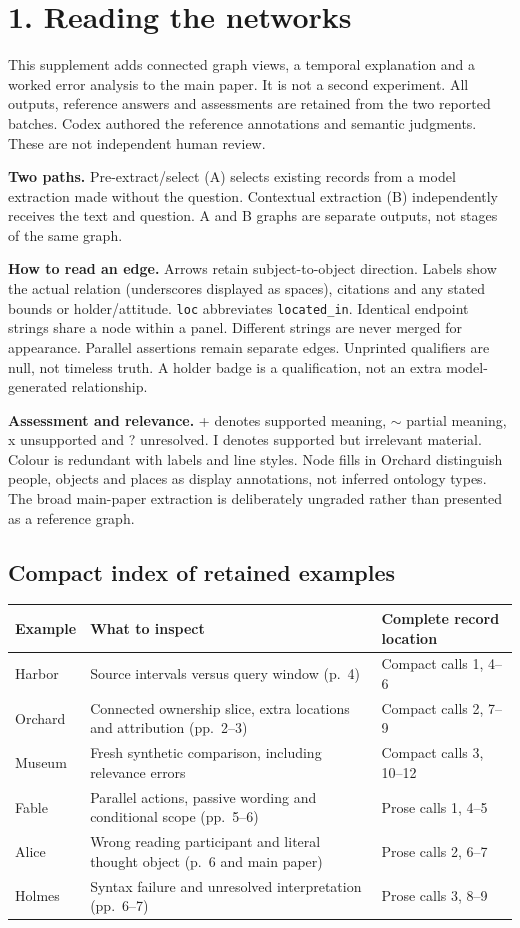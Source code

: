 \section*{1. Reading the networks}
This supplement adds connected graph views, a temporal explanation and a worked error analysis to the main paper. It is not a second experiment. All outputs, reference answers and assessments are retained from the two reported batches. Codex authored the reference annotations and semantic judgments. These are not independent human review.

\textbf{Two paths.} Pre-extract/select (A) selects existing records from a model extraction made without the question. Contextual extraction (B) independently receives the text and question. A and B graphs are separate outputs, not stages of the same graph.

\textbf{How to read an edge.} Arrows retain subject-to-object direction. Labels show the actual relation (underscores displayed as spaces), citations and any stated bounds or holder/attitude. \texttt{loc} abbreviates \texttt{located\_in}. Identical endpoint strings share a node within a panel. Different strings are never merged for appearance. Parallel assertions remain separate edges. Unprinted qualifiers are null, not timeless truth. A holder badge is a qualification, not an extra model-generated relationship.

\textbf{Assessment and relevance.} + denotes supported meaning, $\sim$ partial meaning, x unsupported and ? unresolved. I denotes supported but irrelevant material. Colour is redundant with labels and line styles. Node fills in Orchard distinguish people, objects and places as display annotations, not inferred ontology types. The broad main-paper extraction is deliberately ungraded rather than presented as a reference graph.

\subsection*{Compact index of retained examples}
\begin{tabular}{L{27mm}L{58mm}L{60mm}}
\toprule
Example & What to inspect & Complete record location\\\midrule
Harbor & Source intervals versus query window (p.~4) & Compact calls 1, 4--6\\
Orchard & Connected ownership slice, extra locations and attribution (pp.~2--3) & Compact calls 2, 7--9\\
Museum & Fresh synthetic comparison, including relevance errors & Compact calls 3, 10--12\\
Fable & Parallel actions, passive wording and conditional scope (pp.~5--6) & Prose calls 1, 4--5\\
Alice & Wrong reading participant and literal thought object (p.~6 and main paper) & Prose calls 2, 6--7\\
Holmes & Syntax failure and unresolved interpretation (pp.~6--7) & Prose calls 3, 8--9\\
\bottomrule
\end{tabular}

